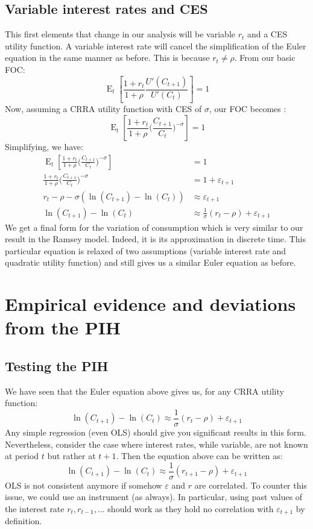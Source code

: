 \documentclass[12pt]{report}
\newcommand{\Et}[1]{\operatorname{E}_t\left[#1\right]}
\begin{document}
\subsection{Variable interest rates and CES}

This first elements that change in our analysis will be variable $r_t$ and a CES utility function. A variable interest rate will cancel the simplification of the Euler equation in the same manner as before. This is because $ r_t \neq \rho $. From our basic FOC: $$ \Et{\frac{1+r_t}{1+\rho} \frac{U'(C_{t+1})}{U'(C_t)}} = 1 $$ Now, assuming a CRRA utility function with CES of $\sigma$, our FOC becomes : $$ \Et{\frac{1+r_t}{1+\rho} \Big(\frac{C_{t+1}}{C_t}\Big)^{-\sigma}} = 1 $$ Simplifying, we have: \begin{align*}
\Et{\frac{1+r_t}{1+\rho} \Big(\frac{C_{t+1}}{C_t}\Big)^{-\sigma}} & = 1 \\
\frac{1+r_t}{1+\rho} \Big(\frac{C_{t+1}}{C_t}\Big)^{-\sigma} & = 1 + \varepsilon_{t+1} \\
r_t - \rho - \sigma(\ln(C_{t+1}) - \ln(C_t)) & \approx \varepsilon_{t+1} \\
\ln(C_{t+1}) - \ln(C_t) & \approx \frac{1}{\sigma} (r_t - \rho) + \varepsilon_{t+1}
\end{align*} We get a final form for the variation of consumption which is very similar to our result in the Ramsey model. Indeed, it is its approximation in discrete time. This particular equation is relaxed of two assumptions (variable interest rate and quadratic utility function) and still gives us a similar Euler equation as before.

\section{Empirical evidence and deviations from the PIH}

\subsection{Testing the PIH}

We have seen that the Euler equation above gives us, for any CRRA utility function: $$ \ln(C_{t+1}) - \ln(C_t) \approx \frac{1}{\sigma} (r_t - \rho) + \varepsilon_{t+1} $$ Any simple regression (even OLS) should give you significant results in this form. Nevertheless, consider the case where interest rates, while variable, are not known at period $t$ but rather at $t+1$. Then the equation above can be written as:$$ \ln(C_{t+1}) - \ln(C_t) \approx \frac{1}{\sigma} (r_{t+1} - \rho) + \varepsilon_{t+1} $$ OLS is not consistent anymore if somehow $\varepsilon$ and $r$ are correlated. To counter this issue, we could use an instrument (as always). In particular, using past values of the interest rate $r_t, r_{t-1}, ...$ should work as they hold no correlation with $\varepsilon_{t+1}$ by definition.
\end{document}
